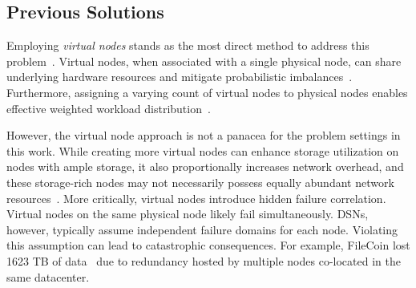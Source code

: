 \subsection{Previous Solutions}
\label{sec:bg:works}

Employing \emph{virtual nodes} stands as the most direct method to address this problem~\cite{chord,dabek2001wide,zhu2005efficient,zhang2010novel}.
Virtual nodes, when associated with a single physical node, can share underlying hardware resources and mitigate probabilistic imbalances~\cite{chord}.
Furthermore, assigning a varying count of virtual nodes to physical nodes enables effective weighted workload distribution~\cite{schindelhauer2005weighted}.

However, the virtual node approach is not a panacea for the problem settings in this work.
While creating more virtual nodes can enhance storage utilization on nodes with ample storage, it also proportionally increases network overhead, and these storage-rich nodes may not necessarily possess equally abundant network resources~\cite{karger2004simple}.
More critically, virtual nodes introduce hidden failure correlation.
Virtual nodes on the same physical node likely fail simultaneously.
DSNs, however, typically assume independent failure domains for each node.
Violating this assumption can lead to catastrophic consequences.
For example, FileCoin lost 1623 TB of data~\cite{filecoin_loss} due to redundancy hosted by multiple nodes co-located in the same datacenter.

